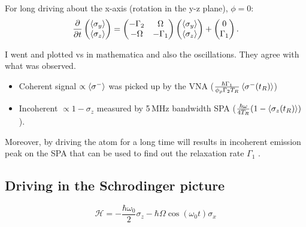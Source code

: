   \noindent For long driving about the x-axis (rotation in the y-z plane), $ \phi = 0 $:
  \begin{equation}
     \frac{\partial}{\partial t}\begin{pmatrix}
      \left\langle \sigma_y \right\rangle\\\left\langle \sigma_z \right\rangle
    \end{pmatrix} = \begin{pmatrix}
      -\Gamma_2&\Omega\\-\Omega&-\Gamma_1\\
    \end{pmatrix}\begin{pmatrix}
      \left\langle \sigma_y \right\rangle\\\left\langle \sigma_z \right\rangle
    \end{pmatrix}+\begin{pmatrix} 0\\\Gamma_1
    \end{pmatrix}.
  \end{equation}
   
  I went and plotted \isigmay vs \isigmaz in mathematica and also the oscillations. They agree
  with what was observed.
   
  \begin{itemize}
  \item   Coherent   signal  $   \propto   \left\langle \sigma^{-} \right\rangle   $  was   picked   up   by  the   VNA
    ($ \frac{\hbar\Gamma_1}{\phi_p\Gamma_2T_R}\left\langle \sigma^{-}(t_R) \right\rangle $)
  \item   Incoherent   $   \propto   1-\sigma_z   $   measured   by   5\,MHz   bandwidth   SPA
    ($ \frac{\hbar\omega}{4T_R}(1-\left\langle \sigma_z(t_R) \right\rangle) $).
  \end{itemize}
   
   
   
    
  Moreover, by driving  the atom for a long  time will results in incoherent  emission peak on
  the SPA that can  be used to find out the relaxation rate  $ \Gamma_1 $  .
  \newpage
 
  \subsection{Driving in the Schrodinger picture}
  \begin{equation}\label{app2}
    \mathcal{H} = -\frac{\hbar\omega_0}{2}\sigma_z-\hbar\Omega\cos(\omega_0 t)\sigma_x
  \end{equation}
  
